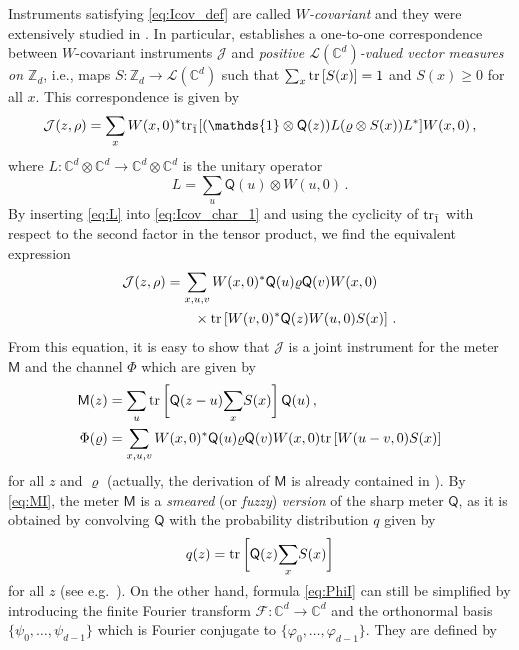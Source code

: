 \documentclass[12pt,reqno]{amsart}
\theoremstyle{definition}
\newcommand{\tr}[1]{{\rm tr}\left[#1\right]} %
\newcommand{\ptr}[2]{{\rm tr}_{#1} #2} %
\newcommand{\id}{\mathds{1}} %
\newcommand{\Mo}{\mathsf{M}}%
\newcommand{\Qo}{\mathsf{Q}}%
\newcommand{\rhoo}{\varrho} %
\newcommand{\phii}{\varphi} %
\newcommand{\Cb}{\mathbb{C}} %
\newcommand{\Zb}{\mathbb{Z}} %
\newcommand{\lc}[1]{\mathcal{L}(\Cb^{#1})} %
\newcommand{\ff}{\mathcal{F}}
\newcommand{\ii}{\mathcal{J}}
\begin{document}
Instruments satisfying \eqref{eq:Icov_def} are called {\em $W$-covariant} and they were extensively studied in \cite{CaHeTo11}. In particular, \cite[Theorem 1]{CaHeTo11} establishes a one-to-one correspondence between $W$-covariant instruments $\ii$ and {\em positive $\lc{d}$-valued vector measures on $\Zb_d$}, i.e., maps $S:\Zb_d\to\lc{d}$ such that $\sum_x \tr{S(x)} = 1$ and $S(x)\geq 0$ for all $x$. This correspondence is given by
\begin{equation}\label{eq:Icov_char_1}
\ii(z,\rho) = \sum_x W(x,0)^*\ptr{\bar{1}}{[(\id\otimes\Qo(z))L(\rhoo\otimes S(x))L^*]}W(x,0)\,,
\end{equation}
where $L:\Cb^d\otimes\Cb^d\to\Cb^d\otimes\Cb^d$ is the unitary operator
\begin{equation}\label{eq:L}
L = \sum_u \Qo(u)\otimes W(u,0)\,.
\end{equation}
By inserting \eqref{eq:L} into \eqref{eq:Icov_char_1} and using the cyclicity of ${\rm tr}_{\bar{1}}$ with respect to the second factor in the tensor product, we find the equivalent expression
\begin{equation} %
\begin{aligned}
\ii(z,\rho) & = \sum_{x,u,v} W(x,0)^*\Qo(u)\rhoo\Qo(v)W(x,0) \\
& \qquad\times\tr{W(v,0)^*\Qo(z)W(u,0)S(x)}\,.
\end{aligned}
\end{equation}
From this equation, it is easy to show that $\ii$ is a joint instrument for the meter $\Mo$ and the channel $\Phi$ which are given by
\begin{align}
\Mo(z) & = \sum_u \tr{\vphantom{\bigg[}\Qo(z-u)\smash{\sum_x} S(x)}\Qo(u)\,,\label{eq:MI} \\
\Phi(\rhoo) & = \sum_{x,u,v} W(x,0)^*\Qo(u)\rhoo\Qo(v)W(x,0) \tr{W(u-v,0)S(x)}\label{eq:PhiI}
\end{align}
for all $z$ and $\rhoo$ (actually, the derivation of $\Mo$ is already contained in \cite[Proposition 1]{CaHeTo11}). By \eqref{eq:MI}, the meter $\Mo$ is a {\em smeared} (or {\em fuzzy}) {\em version} of the sharp meter $\Qo$, as it is obtained by convolving $\Qo$ with the probability distribution $q$ given by
\begin{equation}\label{eq:q}
q(z) = \tr{\vphantom{\bigg[}\Qo(z)\smash{\sum_x} S(x)}
\end{equation}
for all $z$ (see e.g.~\cite{HeLaYl04}). 
On the other hand, formula \eqref{eq:PhiI} can still be simplified by introducing the finite Fourier transform $\ff:\Cb^d\to\Cb^d$ and the orthonormal basis $\{\psi_0,\ldots,\psi_{d-1}\}$ which is Fourier conjugate to $\{\phii_0,\ldots,\phii_{d-1}\}$. They are defined by
\end{document}
